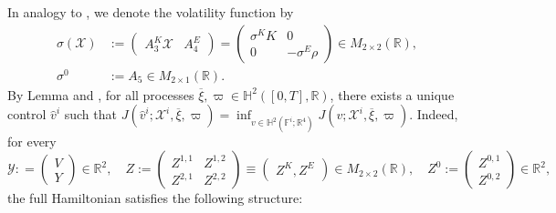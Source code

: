 \documentclass[10pt,a4paper]{amsart}
\numberwithin{equation}{section}
\newcommand{\w}{\varpi}
\newcommand{\R}{\mathbb{R}}
\renewcommand{\bar}{\overline}
\begin{document}
In analogy to \cite{del2024mean}, we denote the volatility function by
\begin{align*}
    \sigma(\mathcal{X}) &:= 
    \begin{pmatrix}
        A^K_3\mathcal{X} & A^E_4  
    \end{pmatrix}
    =
    \begin{pmatrix} 
    \sigma^K K	&0	\\
    0		& -\sigma^E \rho
    \end{pmatrix}\in M_{2\times 2}(\R) ,\\  
    \sigma^0 &:= A_5 \in M_{2\times 1}(\R).
\end{align*}
By Lemma \cite[Lemma 1.56]{carmona2018probabilistic2} and \cite[equation (6.82)]{carmona2018probabilistic2}, for all processes $\bar{\xi}, \w \in \mathbb{H}^2([0,T],\R)$, there exists a unique control $\widehat{v}^i$ such that $J(\widehat{v}^i;\mathcal{X}^i,\bar{\xi},\w)= \inf_{v \in \mathbb{H}^2(\mathbb{F}^i;\mathbb{R}^4)}J(v;\mathcal{X}^i,\bar{\xi},\w)$. 
Indeed, for every
\begin{equation*}
    \mathcal{Y}: = \begin{pmatrix}V\\ Y\end{pmatrix}\in\R^2,\quad Z:= \begin{pmatrix} Z^{1,1}&Z^{1,2}\\Z^{2,1}&Z^{2,2}\end{pmatrix}\equiv \begin{pmatrix}
        Z^K, Z^E
    \end{pmatrix}\in M_{2\times2}(\R) ,\quad Z^0 := \begin{pmatrix}Z^{0,1}\\ Z^{0,2}\end{pmatrix} \in \R^2,
\end{equation*}
the full Hamiltonian satisfies the following structure: 
\end{document}

